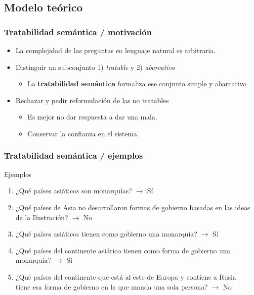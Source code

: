 \subsection{Modelo teórico}


\begin{frame}[<+->]
  \frametitle{Tratabilidad semántica / motivación}
      \begin{itemize}
          \item La complejidad de las preguntas en lenguaje natural es arbitraria.
          \item Distinguir un subconjunto 1) \textit{tratable} y 2) \textit{abarcativo}
          \begin{itemize}
            \item La {\color{blue}\textbf{tratabilidad semántica}} formaliza ese conjunto simple y abarcativo
          \end{itemize}
          \item Rechazar y pedir reformulación de las no tratables
          \begin{itemize}
            \item Es mejor no dar respuesta a dar una mala. 
            \item Conservar la confianza en el sistema.
          \end{itemize}
      \end{itemize}
\end{frame}

\begin{frame}[<+->]
  \frametitle{Tratabilidad semántica / ejemplos}
    \begin{block}{Ejemplos}
      \begin{enumerate}
          \item ¿Qué países asiáticos son monarquías? $\rightarrow$ {\color{green}Sí}
          \item ¿Qué países de Asia no desarrollaron formas de gobierno basadas en las ideas de la Ilustración? $\rightarrow$ {\color{red}No}
          \item ¿Qué países asiáticos tienen como gobierno una monarquía? $\rightarrow$ {\color{green}Sí}
          \item ¿Qué países del continente asiático tienen como forma de gobierno una monarquía? $\rightarrow$ {\color{green}Sí}
          \item ¿Qué países del continente que está al este de Europa y contiene a Rusia tiene esa forma de gobierno en la que manda una sola persona? $\rightarrow$ {\color{red}No}
      \end{enumerate}
    \end{block}
\end{frame}

